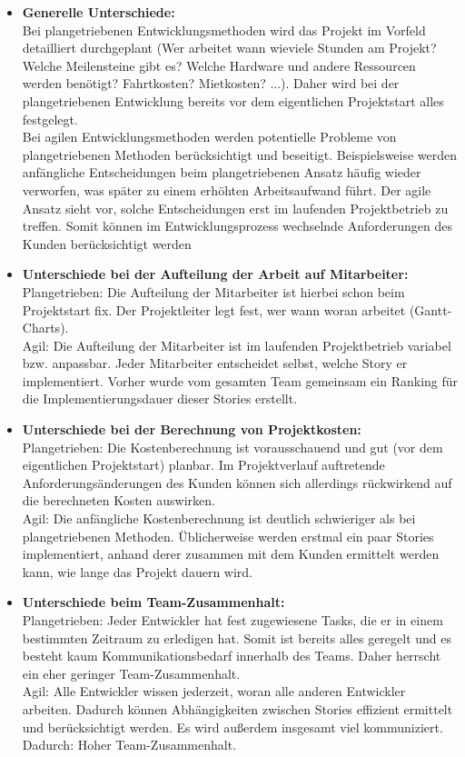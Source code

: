 \documentclass[a4paper,10pt]{article}
\begin{document}
\begin{itemize}
 \item[] \textbf{Generelle Unterschiede:}
 \smallskip \\
 Bei plangetriebenen Entwicklungsmethoden wird das Projekt im Vorfeld detailliert durchgeplant (Wer arbeitet wann wieviele Stunden am Projekt? Welche Meilensteine gibt es? Welche Hardware und andere Ressourcen werden benötigt? Fahrtkosten? Mietkosten? ...). Daher wird bei der plangetriebenen Entwicklung bereits vor dem eigentlichen Projektstart alles festgelegt.
 \smallskip \\
 Bei agilen Entwicklungsmethoden werden potentielle Probleme von plangetriebenen Methoden berücksichtigt und beseitigt. Beispielsweise werden anfängliche Entscheidungen beim plangetriebenen Ansatz häufig wieder verworfen, was später zu einem erhöhten Arbeitsaufwand führt. Der agile Ansatz sieht vor, solche Entscheidungen erst im laufenden Projektbetrieb zu treffen. Somit können im Entwicklungsprozess wechselnde Anforderungen des Kunden berücksichtigt werden
 
 \item[] \textbf{Unterschiede bei der Aufteilung der Arbeit auf Mitarbeiter:}
 \smallskip \\
 Plangetrieben: Die Aufteilung der Mitarbeiter ist hierbei schon beim Projektstart fix. Der Projektleiter legt fest, wer wann woran arbeitet (Gantt-Charts).
 \smallskip \\
 Agil: Die Aufteilung der Mitarbeiter ist im laufenden Projektbetrieb variabel bzw. anpassbar. Jeder Mitarbeiter entscheidet selbst, welche Story er implementiert. Vorher wurde vom gesamten Team gemeinsam ein Ranking für die Implementierungsdauer dieser Stories erstellt.
 
 \item[] \textbf{Unterschiede bei der Berechnung von Projektkosten:}
 \smallskip \\
 Plangetrieben: Die Kostenberechnung ist vorausschauend und gut (vor dem eigentlichen Projektstart) planbar. Im Projektverlauf auftretende Anforderungsänderungen des Kunden können sich allerdings rückwirkend auf die berechneten Kosten auswirken.
 \smallskip \\
 Agil: Die anfängliche Kostenberechnung ist deutlich schwieriger als bei plangetriebenen Methoden. Üblicherweise werden erstmal ein paar Stories implementiert, anhand derer zusammen mit dem Kunden ermittelt werden kann, wie lange das Projekt dauern wird.
 
 \item[] \textbf{Unterschiede beim Team-Zusammenhalt:}
  \smallskip \\
 Plangetrieben: Jeder Entwickler hat fest zugewiesene Tasks, die er in einem bestimmten Zeitraum zu erledigen hat. Somit ist bereits alles geregelt und es besteht kaum Kommunikationsbedarf innerhalb des Teams. Daher herrscht ein eher geringer Team-Zusammenhalt.
 \smallskip \\
 Agil: Alle Entwickler wissen jederzeit, woran alle anderen Entwickler arbeiten. Dadurch können Abhängigkeiten zwischen Stories effizient ermittelt und berücksichtigt werden. Es wird außerdem insgesamt viel kommuniziert. Dadurch: Hoher Team-Zusammenhalt.
 

\end{itemize}
\end{document}
